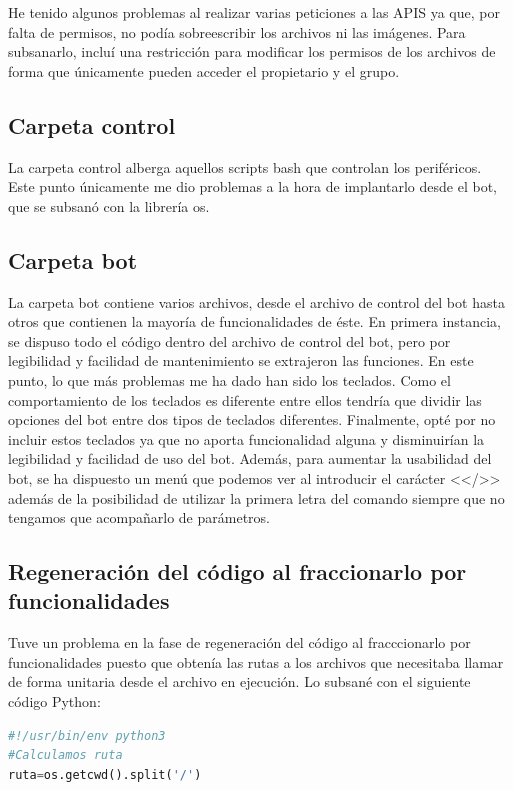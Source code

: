 He tenido algunos problemas al realizar varias peticiones a las APIS ya que, por falta de permisos, no podía sobreescribir los archivos ni las imágenes. Para subsanarlo, incluí una restricción para modificar los permisos de los archivos de forma que únicamente pueden acceder el propietario y el grupo.

\subsection{Carpeta control}
La carpeta control alberga aquellos scripts bash que controlan los periféricos. Este punto únicamente me dio problemas a la hora de implantarlo desde el bot, que se subsanó con la librería os.

\subsection{Carpeta bot}
La carpeta bot contiene varios archivos, desde el archivo de control del bot hasta otros que contienen la mayoría de funcionalidades de éste. En primera instancia, se dispuso todo el código dentro del archivo de control del bot, pero por legibilidad y facilidad de mantenimiento se extrajeron las funciones.
En este punto, lo que más problemas me ha dado han sido los teclados. Como el comportamiento de los teclados es diferente entre ellos tendría que dividir las opciones del bot entre dos tipos de teclados diferentes. Finalmente, opté por no incluir estos teclados ya que no aporta funcionalidad alguna y disminuirían la legibilidad y facilidad de uso del bot. Además, para aumentar la usabilidad del bot, se ha dispuesto un menú que podemos ver al introducir el carácter <</>> además de la posibilidad de utilizar la primera letra del comando siempre que no tengamos que acompañarlo de parámetros.


\subsection{Regeneración del código al fraccionarlo por funcionalidades}

Tuve un problema en la fase de regeneración del código al fracccionarlo por funcionalidades puesto que obtenía las rutas a los archivos que necesitaba llamar de forma unitaria desde el archivo en ejecución.  Lo subsané con el siguiente código Python:
\begin{lstlisting}[language=python, firstnumber=0, basicstyle=\small, caption={Troceado de rutas}]
#!/usr/bin/env python3
#Calculamos ruta
ruta=os.getcwd().split('/')
\end{lstlisting}

